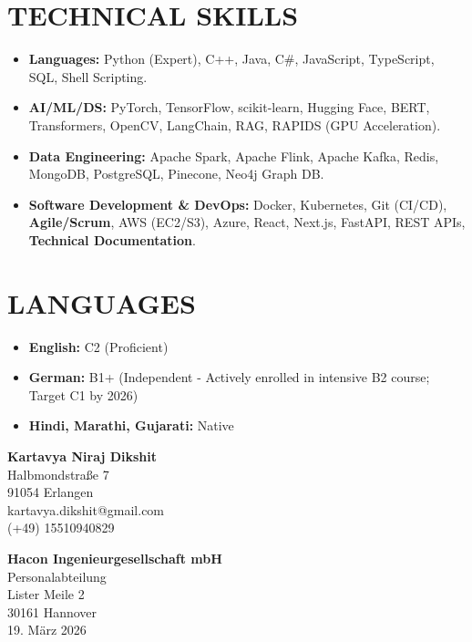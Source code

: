 \documentclass[10pt, a4paper]{article}
\begin{document}
\section{TECHNICAL SKILLS}
\begin{itemize}[leftmargin=1.5em, noitemsep]
    \item \textbf{Languages:} Python (Expert), C++, Java, C\#, JavaScript, TypeScript, SQL, Shell Scripting.
    \item \textbf{AI/ML/DS:} PyTorch, TensorFlow, scikit-learn, Hugging Face, BERT, Transformers, OpenCV, LangChain, RAG, RAPIDS (GPU Acceleration).
    \item \textbf{Data Engineering:} Apache Spark, Apache Flink, Apache Kafka, Redis, MongoDB, PostgreSQL, Pinecone, Neo4j Graph DB.
    \item \textbf{Software Development \& DevOps:} Docker, Kubernetes, Git (CI/CD), \textbf{Agile/Scrum}, AWS (EC2/S3), Azure, React, Next.js, FastAPI, REST APIs, \textbf{Technical Documentation}.
\end{itemize}

\section{LANGUAGES}
\begin{itemize}[leftmargin=1.5em, noitemsep]
    \item \textbf{English:} C2 (Proficient)
    \item \textbf{German:} B1+ (Independent - Actively enrolled in intensive B2 course; Target C1 by 2026)
    \item \textbf{Hindi, Marathi, Gujarati:} Native
\end{itemize}

\newpage
{}

\begin{flushleft}
    \textbf{Kartavya Niraj Dikshit} \\
    Halbmondstraße 7 \\
    91054 Erlangen \\
    kartavya.dikshit@gmail.com \\
    (+49) 15510940829
\end{flushleft}

\begin{flushright}
    \textbf{Hacon Ingenieurgesellschaft mbH} \\
    Personalabteilung \\
    Lister Meile 2 \\
    30161 Hannover \\
    \vspace{10pt}
    19. März 2026
\end{flushright}
\end{document}

